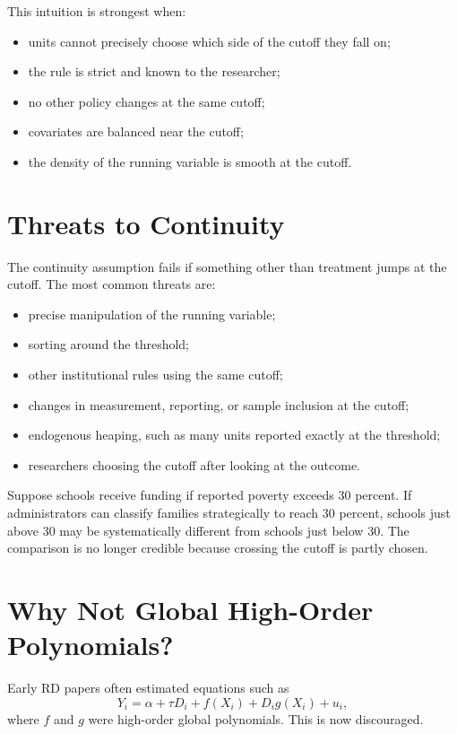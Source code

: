 This intuition is strongest when:
\begin{itemize}
    \item units cannot precisely choose which side of the cutoff they fall on;
    \item the rule is strict and known to the researcher;
    \item no other policy changes at the same cutoff;
    \item covariates are balanced near the cutoff;
    \item the density of the running variable is smooth at the cutoff.
\end{itemize}

\section{Threats to Continuity}

The continuity assumption fails if something other than treatment jumps at the cutoff. The most common threats are:
\begin{itemize}
    \item precise manipulation of the running variable;
    \item sorting around the threshold;
    \item other institutional rules using the same cutoff;
    \item changes in measurement, reporting, or sample inclusion at the cutoff;
    \item endogenous heaping, such as many units reported exactly at the threshold;
    \item researchers choosing the cutoff after looking at the outcome.
\end{itemize}

\begin{exmp}[Manipulation]
Suppose schools receive funding if reported poverty exceeds 30 percent. If administrators can classify families strategically to reach 30 percent, schools just above 30 may be systematically different from schools just below 30. The comparison is no longer credible because crossing the cutoff is partly chosen.
\end{exmp}

\section{Why Not Global High-Order Polynomials?}

Early RD papers often estimated equations such as
\[
    Y_i = \alpha + \tau D_i + f(X_i) + D_i g(X_i) + u_i,
\]
where $f$ and $g$ were high-order global polynomials. This is now discouraged.

